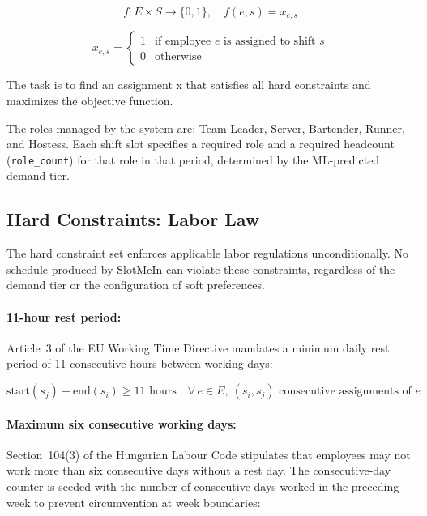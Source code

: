 \documentclass[12pt,a4paper,oneside]{article}
\begin{document}
\begin{equation*}
f: E \times S \rightarrow \{0, 1\}, \quad f(e, s) = x_{e,s}
\end{equation*}

\begin{equation*}
x_{e,s} = \begin{cases} 1 & \text{if employee } e \text{ is assigned to shift } s \\ 0 & \text{otherwise} \end{cases}
\end{equation*}

The task is to find an assignment x that satisfies all hard constraints and maximizes the objective function.

The roles managed by the system are: Team Leader, Server, Bartender, Runner, and Hostess. Each shift slot specifies a required role and a required headcount (\texttt{role\_count}) for that role in that period, determined by the ML-predicted demand tier.

\subsection{Hard Constraints: Labor Law}

The hard constraint set enforces applicable labor regulations unconditionally. No schedule produced by SlotMeIn can violate these constraints, regardless of the demand tier or the configuration of soft preferences.

\paragraph{11-hour rest period:} Article~3 of the EU Working Time Directive \citep{wtd2003} mandates a minimum daily rest period of 11 consecutive hours between working days:

\begin{equation}
\text{start}(s_j) - \text{end}(s_i) \geq 11 \text{ hours} \quad \forall\, e \in E,\ (s_i, s_j) \text{ consecutive assignments of } e
\label{eq:rest}
\end{equation}

\paragraph{Maximum six consecutive working days:} Section~104(3) of the Hungarian Labour Code \citep{hungarian2012} stipulates that employees may not work more than six consecutive days without a rest day. The consecutive-day counter is seeded with the number of consecutive days worked in the preceding week to prevent circumvention at week boundaries:
\end{document}
